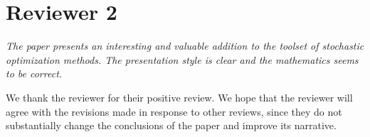 \documentclass[11pt]{article}
\begin{document}
\section{Reviewer 2}

\textit{The paper presents an interesting and valuable addition to the toolset of stochastic optimization methods. 
The presentation style is clear and the mathematics seems to be correct.}

We thank the reviewer for their positive review. We hope that the reviewer
will agree with the revisions made in response to other reviews, since
they do not substantially change the conclusions of the paper
and improve its narrative. 
\end{document}

